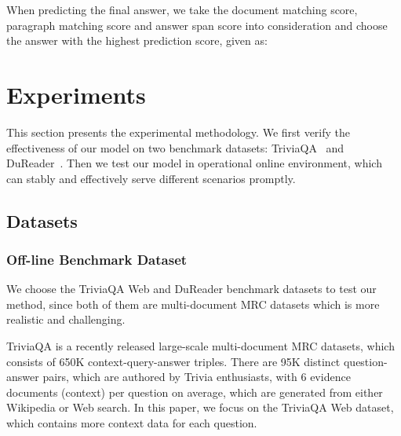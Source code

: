 \documentclass[letterpaper]{article} \usepackage{aaai19}  \usepackage{graphicx}
\begin{document}
When predicting the final answer, we take the document matching score, paragraph matching score and answer span score into consideration and choose the answer with the highest prediction score, given as:

















































\section{Experiments}

This section presents the experimental methodology. We first verify the effectiveness of our model on two benchmark datasets: TriviaQA~\cite{joshi2017triviaqa} and DuReader~\cite{he2017dureader}. Then we test our model in  operational online environment, which can stably and effectively serve different scenarios promptly. 



\subsection{Datasets}

\subsubsection{Off-line Benchmark Dataset}
We choose the TriviaQA Web and DuReader benchmark datasets to test our method, since both of them are multi-document MRC datasets which is more realistic and challenging. 


TriviaQA is a recently released large-scale multi-document MRC datasets, which consists of 650K context-query-answer triples. There are 95K distinct question-answer pairs, which are 
authored by Trivia enthusiasts, with 6 evidence documents (context) per question on average, which are generated from either Wikipedia or Web search. In this paper, we focus on the TriviaQA Web dataset, which contains more context data for each question. 
\end{document}
